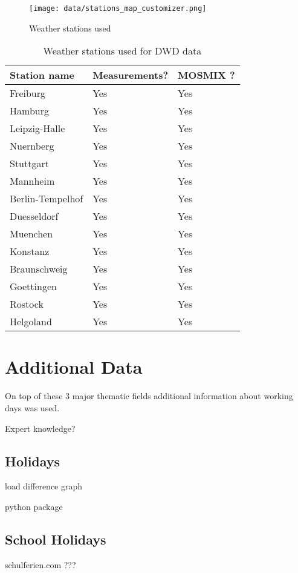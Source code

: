\documentclass[class=scrbook, crop=false]{standalone}
\begin{document}
\begin{figure}[ht]
            \centering
            \texttt{[image: data/stations\_map\_customizer.png]}
            \caption[Weather stations used]{Weather stations used}
            \label{fig::weather_stations}
 \end{figure}
 

\begin{table}[]
\begin{tabular}{l|l|l}
Station name & Measurements? & MOSMIX ?\\\hline
   Freiburg&Yes&Yes\\
   Hamburg&Yes&Yes\\
    Leipzig-Halle&Yes&Yes\\
    Nuernberg&Yes&Yes\\
    Stuttgart&Yes&Yes\\
    Mannheim&Yes&Yes\\
    Berlin-Tempelhof&Yes&Yes\\
    Duesseldorf&Yes&Yes\\
    Muenchen&Yes&Yes\\
   Konstanz&Yes&Yes\\
   Braunschweig&Yes&Yes\\
   Goettingen&Yes&Yes\\
   Rostock&Yes&Yes\\
   Helgoland&Yes&Yes   
\end{tabular}
\caption{Weather stations used for DWD data}
\label{Table::Weather_Stations}
\end{table}



 
 

\section{Additional Data}
\label{Section::Additional_Data}
On top of these 3 major thematic fields additional information about working days was used. 

Expert knowledge?


\subsection{Holidays}

load difference graph

python package 

\subsection{School Holidays}

schulferien.com ???
\end{document}
